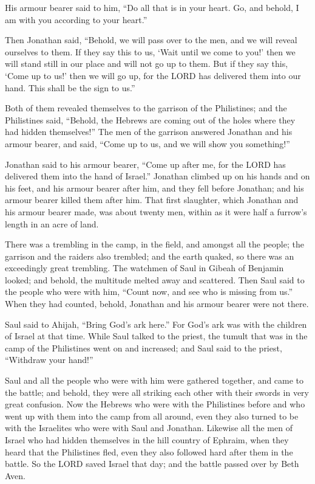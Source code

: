  His armour bearer said to him, ``Do all that is in your
heart. Go, and behold, I am with you according to your heart.''

 Then Jonathan said, ``Behold, we will pass over to the men,
and we will reveal ourselves to them.  If they say this to
us, `Wait until we come to you!' then we will stand still in our place
and will not go up to them.  But if they say this, `Come up
to us!' then we will go up, for the LORD has delivered them into our
hand. This shall be the sign to us.''

 Both of them revealed themselves to the garrison of the
Philistines; and the Philistines said, ``Behold, the Hebrews are coming
out of the holes where they had hidden themselves!''  The
men of the garrison answered Jonathan and his armour bearer, and said,
``Come up to us, and we will show you something!''

Jonathan said to his armour bearer, ``Come up after me, for the LORD has
delivered them into the hand of Israel.''  Jonathan climbed
up on his hands and on his feet, and his armour bearer after him, and
they fell before Jonathan; and his armour bearer killed them after him.
 That first slaughter, which Jonathan and his armour bearer
made, was about twenty men, within as it were half a furrow's length in
an acre of land.

 There was a trembling in the camp, in the field, and
amongst all the people; the garrison and the raiders also trembled; and
the earth quaked, so there was an exceedingly great trembling.
 The watchmen of Saul in Gibeah of Benjamin looked; and
behold, the multitude melted away and scattered.  Then Saul
said to the people who were with him, ``Count now, and see who is
missing from us.'' When they had counted, behold, Jonathan and his
armour bearer were not there.

 Saul said to Ahijah, ``Bring God's ark here.'' For God's
ark was with the children of Israel at that time.  While
Saul talked to the priest, the tumult that was in the camp of the
Philistines went on and increased; and Saul said to the priest,
``Withdraw your hand!''

 Saul and all the people who were with him were gathered
together, and came to the battle; and behold, they were all striking
each other with their swords in very great confusion.  Now
the Hebrews who were with the Philistines before and who went up with
them into the camp from all around, even they also turned to be with the
Israelites who were with Saul and Jonathan.  Likewise all
the men of Israel who had hidden themselves in the hill country of
Ephraim, when they heard that the Philistines fled, even they also
followed hard after them in the battle.  So the LORD saved
Israel that day; and the battle passed over by Beth Aven.

